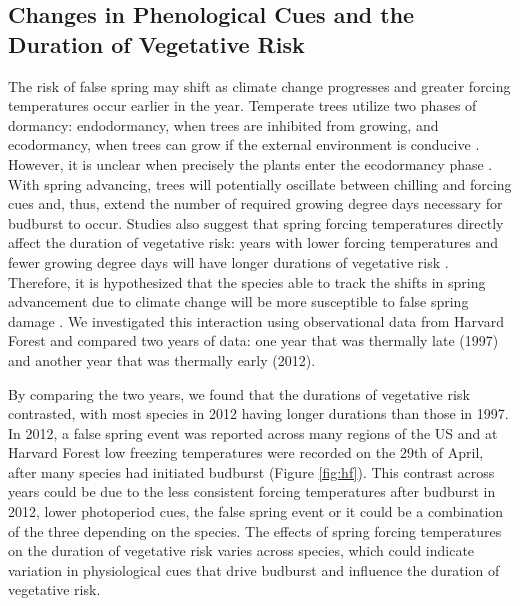 \documentclass{article}\usepackage[]{graphicx}\usepackage[]{color}
\begin{document}
\subsection{Changes in Phenological Cues and the Duration of Vegetative Risk}
The risk of false spring may shift as climate change progresses and greater forcing temperatures occur earlier in the year. Temperate trees utilize two phases of dormancy: endodormancy, when trees are inhibited from growing, and ecodormancy, when trees can grow if the external environment is conducive \citep{Basler2012}. However, it is unclear when precisely the plants enter the ecodormancy phase \citep{Chuine2016}. With spring advancing, trees will potentially oscillate between chilling and forcing cues \citep{Martin2010} and, thus,  extend the number of required growing degree days necessary for budburst to occur. Studies also suggest that spring forcing temperatures directly affect the duration of vegetative risk: years with lower forcing temperatures and fewer growing degree days will have longer durations of vegetative risk \citep{Donnelly2017}. Therefore, it is hypothesized that the species able to track the shifts in spring advancement due to climate change will be more susceptible to false spring damage \citep{Scheifinger2003}. We investigated this interaction using observational data from Harvard Forest \citep{Okeefe2014} and compared two years of data: one year that was thermally late (1997) and another year that was thermally early (2012).

By comparing the two years, we found that the durations of vegetative risk contrasted, with most species in 2012 having longer durations than those in 1997. In 2012, a false spring event was reported across many regions of the US and at Harvard Forest low freezing temperatures were recorded on the 29th of April, after many species had initiated budburst (Figure \ref{fig:hf}). This contrast across years could be due to the less consistent forcing temperatures after budburst in 2012, lower photoperiod cues, the false spring event or it could be a combination of the three depending on the species. The effects of spring forcing temperatures on the duration of vegetative risk varies across species, which could indicate variation in physiological cues that drive budburst and influence the duration of vegetative risk.
\end{document}
